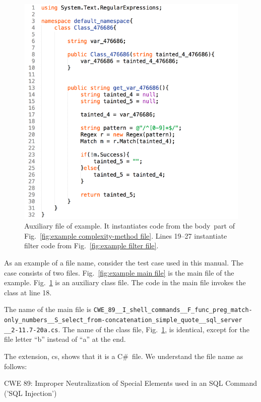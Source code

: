 \documentclass[12pt]{article}
\newcommand{\CSharp}{C{\fontseries{b}\selectfont\#}}
\begin{document}
\begin{figure}[htbp]
  \includegraphics[width=0.85\linewidth]{fig_example_code2.png}
  \caption{Auxiliary file of example.  It instantiates code from the
    \texlangle body\texrangle\ part of Fig.~\ref{fig:example complexity-method file}.
    Lines 19--27 instantiate filter code
    from Fig.~\ref{fig:example filter file}.}
  \label{fig:example aux file}
\end{figure}

As an example of a file name, consider the test case used in this manual.  The case
consists of
two files.
Fig.~\ref{fig:example main file} is the main file of the example.  
Fig.~\ref{fig:example aux file} is an auxiliary class file.  
The code in
the main file invokes the class at line 18.

The name of the main file is
\verb|CWE_89__I_shell_commands__F_func_preg_match-| \\
\verb|only_numbers__S_select_from-concatenation_simple_quote__sql_server| \\
\verb|__2-11.7-20a.cs|.
The name of the class file, Fig.~\ref{fig:example aux file}, is
identical, except for the
file letter ``b'' instead of ``a'' at the end.

The extension, cs, shows that it is a \CSharp\ file.
We understand the file name as follows:

\noindent CWE 89: Improper Neutralization of Special Elements used in an SQL Command
('SQL Injection') \cite{CWE89}
\end{document}
